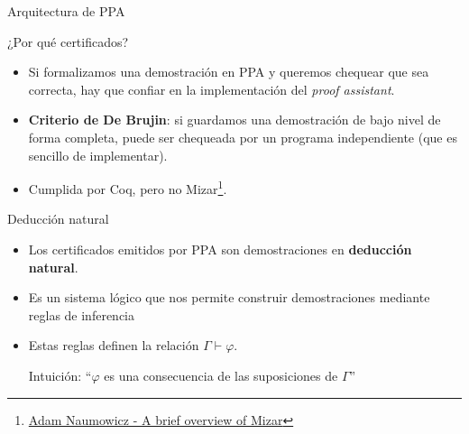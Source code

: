 \documentclass[xcolor={dvipsnames},spanish]{beamer}
\begin{document}


\begin{frame}{Arquitectura de PPA}

\begin{figure}
    \centering
\end{figure}

\end{frame}

\begin{frame}{¿Por qué certificados?}

    \begin{itemize}
        \item Si formalizamos una demostración en PPA y queremos chequear que sea correcta, hay que confiar en la implementación del \textit{proof assistant}.
        \item \textbf{Criterio de De Brujin}: si guardamos una demostración de bajo nivel de forma completa, puede ser chequeada por un programa independiente (que es sencillo de implementar).
        \item Cumplida por Coq, pero no Mizar\footnote{\href{https://www.researchgate.net/publication/225341870_A_Brief_Overview_of_Mizar}{Adam Naumowicz - A brief overview of Mizar}}.
    \end{itemize}

\end{frame}

\begin{frame}{Deducción natural}
    \begin{itemize}
        \item Los certificados emitidos por PPA son demostraciones en \textbf{deducción natural}.
        \item Es un sistema lógico que nos permite construir demostraciones mediante reglas de inferencia
        \item Estas reglas definen la relación $\Gamma \vdash \varphi$. 
        
        Intuición: ``$\varphi$ es una consecuencia de las suposiciones de $\Gamma$''
    \end{itemize}
\end{frame}
\end{document}
